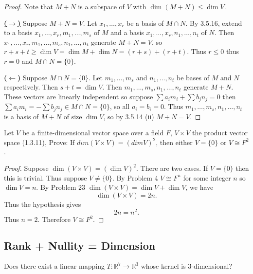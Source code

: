 \begin{proof}
    Note that $M + N$ is a subspace of $V$ with $\dim(M + N) \le \dim V$.

    \underline{\textbf{($\longrightarrow$)}}
    Suppose $M + N = V$. Let $x_1, \ldots, x_r$ be a basis of $M \cap N$.
    By 3.5.16, extend to a basis $x_1, \ldots, x_r, m_1, \ldots, m_s$ of $M$
    and a basis $x_1, \ldots, x_r, n_1, \ldots, n_t$ of $N$.
    Then $x_1, \ldots, x_r, m_1, \ldots, m_s, n_1, \ldots, n_t$ generate $M + N = V$,
    so $r + s + t \ge \dim V = \dim M + \dim N = (r + s) + (r + t)$.
    Thus $r \le 0$ thus $r = 0$ and $M \cap N = \{0\}$.

    \underline{\textbf{($\longleftarrow$)}}
    Suppose $M \cap N = \{0\}$. Let $m_1, \ldots, m_s$ and $n_1, \ldots, n_t$
    be bases of $M$ and $N$ respectively.
    Then $s + t = \dim V$.
    Then $m_1, \ldots, m_s, n_1, \ldots, n_t$ generate $M + N$.
    These vectors are linearly independent so suppose $\sum a_i m_i + \sum b_j n_j = 0$
        then $\sum a_i m_i = -\sum b_j n_j \in M \cap N = \{0\}$,
        so all $a_i = b_i = 0$.
    Thus $m_1, \ldots, m_s, n_1, \ldots, n_t$ is a basis of $M + N$ of size $\dim V$,
        so by 3.5.14 (ii) $M + N = V$.
\end{proof}

\begin{tcolorbox}[title=Problem 27, breakable]
    Let $V$ be a finite-dimensional vector space over a field $F$,
    $V \times V$ the product vector space (1.3.11), Prove:
    If $dim(V \times V) = (dim V)^2$, then either $V = \{0\}$ or $V \cong F^2$.
\end{tcolorbox}

\begin{proof}
    Suppose $\dim(V \times V) = (\dim V)^2$.
    There are two cases.
    If $V = \{0\}$ then this is trivial.
    Thus suppose $V \ne \{0\}$.
    By Problem 4 $V \cong F^n$ for some integer $n$ so $\dim V = n$.
    By Problem 23 $\dim(V \times V) = \dim V + \dim V$, we have
    \[
    \dim(V \times V) = 2n.
    \]
    Thus the hypothesis gives
    \[
    2n = n^2.
    \]
    Thus $n=2$.
    Therefore $V \cong F^2$.
\end{proof}

\subsection{Rank + Nullity = Dimension}

\begin{tcolorbox}[title=Problem 1, breakable]
    Does there exist a linear mapping $T : \mathbb{R}^7 \longrightarrow \mathbb{R}^3$
    whose kernel is 3-dimensional?
\end{tcolorbox}


